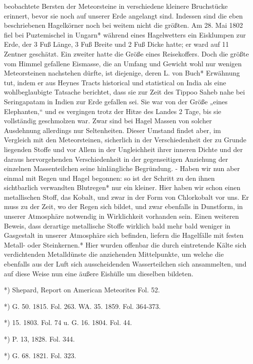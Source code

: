 \documentclass[a4paper, 8pt, oneside, polutonikogreek, german]{article}
\begin{document}
beobachtete Bersten der Meteorsteine in verschiedene kleinere Bruchstücke erinnert, bevor sie noch auf unserer Erde angelangt sind. Indessen sind die eben beschriebenen Hagelkörner noch bei weitem nicht die größten. Am 28. Mai 1802 fiel bei Puztemischel in Ungarn* während eines Hagelwetters ein Eisklumpen zur Erde, der 3 Fuß Länge, 3 Fuß Breite und 2 Fuß Dicke hatte; er ward auf 11 Zentner geschätzt. Ein zweiter hatte die Größe eines Reisekoffers. Doch die größte vom Himmel gefallene Eismasse, die an Umfang und Gewicht wohl nur wenigen Meteorsteinen nachstehen dürfte, ist diejenige, deren L. von Buch* Erwähnung tut, indem er aus Heynes Tracts historical und statistical on India als eine wohlbeglaubigte Tatsache berichtet, dass sie zur Zeit des Tippoo Saheb nahe bei Seringapatam in Indien zur Erde gefallen sei. Sie war von der Größe „eines Elephanten,“ und es vergingen trotz der Hitze des Landes 2 Tage, bis sie vollständig geschmolzen war. Zwar sind bei Hagel Massen von solcher Ausdehnung allerdings nur Seltenheiten. Dieser Umstand findet aber, im Vergleich mit den Meteorsteinen, sicherlich in der Verschiedenheit der zu Grunde liegenden Stoffe und vor Allem in der Ungleichheit ihrer inneren Dichte und der daraus hervorgehenden Verschiedenheit in der gegenseitigen Anziehung der einzelnen Massenteilchen seine hinlängliche Begründung. - Haben wir nun aber einmal mit Regen und Hagel begonnen: so ist der Schritt zu den ihnen sichtbarlich verwandten Blutregen* nur ein kleiner. Hier haben wir schon einen metallischen Stoff, das Kobalt, und zwar in der Form von Chlorkobalt vor uns. Er muss zu der Zeit, wo der Regen sich bildet, und zwar ebenfalls in Dunstform, in unserer Atmosphäre notwendig in Wirklichkeit vorhanden sein. Einen weiteren Beweis, dass derartige metallische Stoffe wirklich bald mehr bald weniger in Gasgestalt in unserer Atmosphäre sich befinden, liefern die Hagelfälle mit festen Metall- oder Steinkernen.* Hier wurden offenbar die durch eintretende Kälte sich verdichtenden Metalldünste die anziehenden Mittelpunkte, um welche die ebenfalls aus der Luft sich ausscheidenden Wasserteilchen sich ansammelten, und auf diese Weise nun eine äußere Eishülle um dieselben bildeten.

*) Shepard, Report on American Meteorites Fol. 52.

*) G. 50. 1815. Fol. 263. WA. 35. 1859. Fol. 364-373.

*) 15. 1803. Fol. 74 u. G. 16. 1804. Fol. 44.

*) P. 13, 1828. Fol. 344.

*) G. 68. 1821. Fol. 323.
\end{document}

